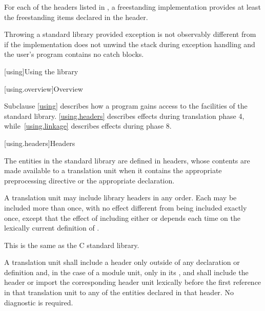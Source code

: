 \pnum
For each of the headers listed in ,
a freestanding implementation provides at least
the freestanding items declared in the header.
%

\pnum
\begin{note}
Throwing a standard library provided exception
is not observably different from 
if the implementation does not
unwind the stack during exception handling and
the user's program contains no catch blocks.
\end{note}

[using]{Using the library}

[using.overview]{Overview}

\pnum
Subclause \ref{using} describes how a \Cpp{} program gains access to the facilities of the
\Cpp{} standard library. \ref{using.headers} describes effects during translation
phase 4, while~\ref{using.linkage} describes effects during phase
8.

[using.headers]{Headers}

\pnum
The entities in the \Cpp{} standard library are defined in headers,
whose contents are made available to a translation unit when it contains the appropriate
%
%
preprocessing directive
or the appropriate
%
 declaration.

\pnum
A translation unit may include library headers in any order.
%
Each may be included more than once, with no effect different from
being included exactly once, except that the effect of including either
 or 
depends each time on the lexically current definition of
%
%
.
\begin{footnote}
This is the same as the C standard library.
\end{footnote}

\pnum
A translation unit shall include a header only outside of any
%
declaration or definition and,
in the case of a module unit,
only in its , and
shall include the header or import the corresponding header unit lexically
before the first reference in that translation unit to any of the entities
declared in that header. No diagnostic is required.

